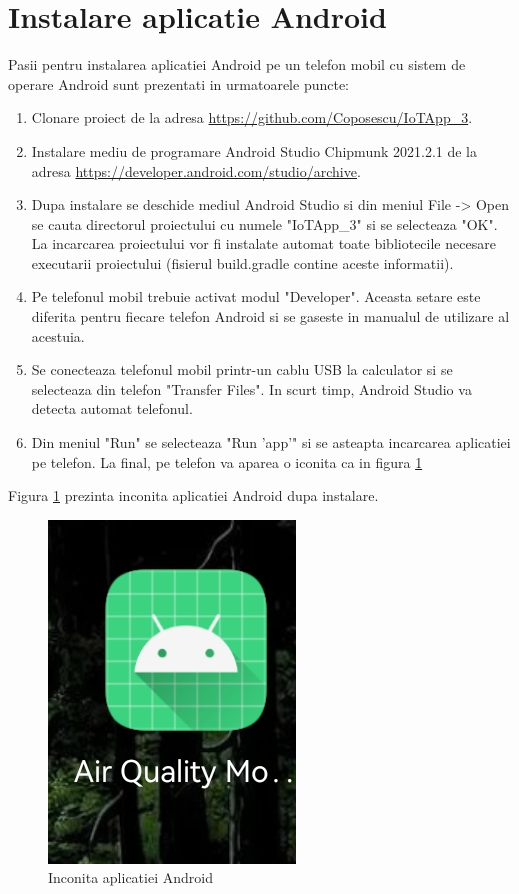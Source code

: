\section{Instalare aplicatie Android}\label{sec:iu_instalare_app_android}
Pasii pentru instalarea aplicatiei Android pe un telefon mobil cu sistem de operare Android sunt prezentati in urmatoarele puncte:
\begin{enumerate}
    \item Clonare proiect de la adresa \url{https://github.com/Coposescu/IoTApp_3}.
    \item Instalare mediu de programare Android Studio Chipmunk 2021.2.1 de la adresa \url{https://developer.android.com/studio/archive}.
    \item Dupa instalare se deschide mediul Android Studio si din meniul File -> Open se cauta directorul proiectului cu numele "IoTApp\_3" si se selecteaza "OK". La 
    incarcarea proiectului vor fi instalate automat toate bibliotecile necesare executarii proiectului (fisierul build.gradle contine aceste informatii).
    \item Pe telefonul mobil trebuie activat modul "Developer". Aceasta setare este diferita pentru fiecare telefon Android si se gaseste in manualul de utilizare al 
    acestuia.
    \item Se conecteaza telefonul mobil printr-un cablu USB la calculator si se selecteaza din telefon "Transfer Files". In scurt timp, Android Studio va detecta automat 
    telefonul.
    \item Din meniul "Run" se selecteaza "Run 'app'" si se asteapta incarcarea aplicatiei pe telefon. La final, pe telefon va aparea o iconita ca in figura 
    \ref{fig:iu_android_icon}
\end{enumerate}

Figura \ref{fig:iu_android_icon} prezinta inconita aplicatiei Android dupa instalare.
\begin{figure}[H]
    \centering
    \includegraphics[scale=0.3]{figs/iu_android_icon.png}
    \caption{Inconita aplicatiei Android}
    \label{fig:iu_android_icon}
\end{figure}

